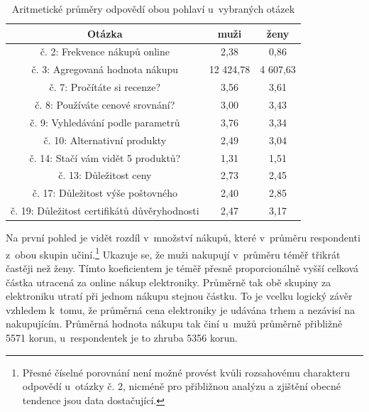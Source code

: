\documentclass[12pt,oneside,openany]{fithesis}
\begin{document}
                \begin{table}[htb]
                    \begin{center}%
                        \begin{tabular}{|c|c|c|}
                            \hline 
                            {{Otázka}} & {{muži}} & {{ženy}} \tabularnewline
                             \hline 
                             {{č. 2: Frekvence nákupů online}} & {{2,38}} & 
{{0,86}} \tabularnewline
                              \hline 
                              {{č. 3: Agregovaná hodnota nákupu}} & {{12 
424,78}} & {{4 607,63}} \tabularnewline
                               \hline 
                               {{č. 7: Pročítáte si recenze?}} & {{3,56}} & 
{{3,61}} \tabularnewline
                                \hline 
                                {{č. 8: Používáte cenové srovnání?}} & 
{{3,00}} & {{3,43}} \tabularnewline
                                 \hline 
                                 {{č. 9: Vyhledávání podle parametrů}} & 
{{3,76}} & {{3,34}} \tabularnewline
                                  \hline 
                                  {{č. 10: Alternativní produkty}} & {{2,49}} 
& {{3,04}} \tabularnewline
                                   \hline 
                                   {{č. 14: Stačí vám vidět 5 produktů?}} 
& {{1,31}} & {{1,51}} \tabularnewline
                                    \hline 
                                    {{č. 13: Důležitost ceny}} & {{2,73}} & 
{{2,45}} \tabularnewline
                                     \hline 
                                     {{č. 17: Důležitost výše 
poštovného}} & {{2,40}} & {{2,85}} \tabularnewline
                                      \hline 
                                      {{č. 19: Důležitost certifikátů 
důvěryhodnosti}} & {{2,47}} & {{3,17}} \tabularnewline
                                      \hline 
                                  \end{tabular}
                                  \caption{Aritmetické průměry odpovědí obou pohlaví u~vybraných otázek}\label{tab-prumery}
                              \end{center}
                          \end{table}

                          Na první pohled je vidět rozdíl v~množství 
nákupů, které v~průměru respondenti z~obou skupin 
učiní.\footnote{
                              Přesné číselné porovnání není možné 
provést kvůli rozsahovému charakteru odpovědí u~otázky č. 2, nicméně 
pro přibližnou analýzu a zjištění obecné tendence jsou data 
dostačující.
                          }
Ukazuje se, že muži nakupují v~průměru téměř třikrát častěji než 
ženy. Tímto koeficientem je téměř přesně proporcionálně vyšší 
celková částka utracená za online nákup elektroniky. Průměrně tak obě 
skupiny za elektroniku utratí při jednom nákupu stejnou částku. To je 
vcelku logický závěr vzhledem k~tomu, že průměrná cena elektroniky je 
udávána trhem a nezávisí na nakupujícím. Průměrná hodnota nákupu tak 
činí u~mužů průměrně přibližně 5571 korun, u~respondentek je 
to zhruba 5356 korun.
\end{document}
